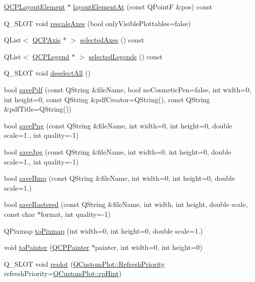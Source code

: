 \begin{DoxyCompactItemize}
\hyperlink{class_q_c_p_layout_element}{Q\+C\+P\+Layout\+Element} $\ast$ \hyperlink{class_q_custom_plot_afaa1d304e0287d140fd238e90889ef3c}{layout\+Element\+At} (const Q\+PointF \&pos) const
\item 
Q\+\_\+\+S\+L\+OT void \hyperlink{class_q_custom_plot_ad86528f2cee6c7e446dea4a6e8839935}{rescale\+Axes} (bool only\+Visible\+Plottables=false)
\item 
Q\+List$<$ \hyperlink{class_q_c_p_axis}{Q\+C\+P\+Axis} $\ast$ $>$ \hyperlink{class_q_custom_plot_a7e6b07792b1cb2c31681596582d14dbe}{selected\+Axes} () const
\item 
Q\+List$<$ \hyperlink{class_q_c_p_legend}{Q\+C\+P\+Legend} $\ast$ $>$ \hyperlink{class_q_custom_plot_ac87624ddff1cbf4064781a8e8ae321c4}{selected\+Legends} () const
\item 
Q\+\_\+\+S\+L\+OT void \hyperlink{class_q_custom_plot_a9d4808ab925b003054085246c92a257c}{deselect\+All} ()
\item 
bool \hyperlink{class_q_custom_plot_a632da44c6d94ea8b271eb483b08b5114}{save\+Pdf} (const Q\+String \&file\+Name, bool no\+Cosmetic\+Pen=false, int width=0, int height=0, const Q\+String \&pdf\+Creator=Q\+String(), const Q\+String \&pdf\+Title=Q\+String())
\item 
bool \hyperlink{class_q_custom_plot_a7636261aff1f6d25c9da749ece3fc8b8}{save\+Png} (const Q\+String \&file\+Name, int width=0, int height=0, double scale=1., int quality=-\/1)
\item 
bool \hyperlink{class_q_custom_plot_a490c722092d1771e8ce4a7a73dfd84ab}{save\+Jpg} (const Q\+String \&file\+Name, int width=0, int height=0, double scale=1., int quality=-\/1)
\item 
bool \hyperlink{class_q_custom_plot_a6629d9e8e6da4bf18055ee0257fdce9a}{save\+Bmp} (const Q\+String \&file\+Name, int width=0, int height=0, double scale=1.)
\item 
bool \hyperlink{class_q_custom_plot_ab528b84cf92baabe29b1d0ef2f77c93e}{save\+Rastered} (const Q\+String \&file\+Name, int width, int height, double scale, const char $\ast$format, int quality=-\/1)
\item 
Q\+Pixmap \hyperlink{class_q_custom_plot_aabb974d71ce96c137dc04eb6eab844fe}{to\+Pixmap} (int width=0, int height=0, double scale=1.)
\item 
void \hyperlink{class_q_custom_plot_a1be68d5c0f1e086d6374d1340a193fb9}{to\+Painter} (\hyperlink{class_q_c_p_painter}{Q\+C\+P\+Painter} $\ast$painter, int width=0, int height=0)
\item 
Q\+\_\+\+S\+L\+OT void \hyperlink{class_q_custom_plot_a606fd384b2a637ce2c24899bcbde77d6}{replot} (\hyperlink{class_q_custom_plot_a45d61392d13042e712a956d27762aa39}{Q\+Custom\+Plot\+::\+Refresh\+Priority} refresh\+Priority=\hyperlink{class_q_custom_plot_a45d61392d13042e712a956d27762aa39adfa1f2387617168d9299f4c8ad15b332}{Q\+Custom\+Plot\+::rp\+Hint})
\end{DoxyCompactItemize}
